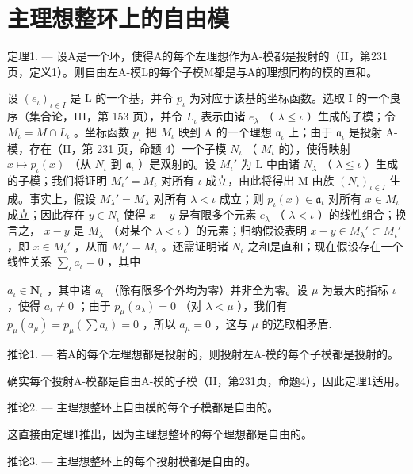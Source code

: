 \section{主理想整环上的自由模}

定理1. --- 设A是一个环，使得A的每个左理想作为A-模都是投射的（II，第231页，定义1）。则自由左A-模L的每个子模M都是与A的理想同构的模的直和。

设 \((e_{\iota})_{\iota \in I}\) 是 L 的一个基，并令 \(p_{\iota}\) 为对应于该基的坐标函数。选取 I 的一个良序（集合论，III，第 153 页），并令 \(L_{\iota}\) 表示由诸 \(e_{\lambda}\) （ \(\lambda \leqslant \iota\) ）生成的子模；令 \(M_{\iota} = M \cap L_{\iota}\) 。坐标函数 \(p_{\iota}\) 把 \(M_{\iota}\) 映到 A 的一个理想 \(\mathfrak{a}_{\iota}\) 上；由于 \(\mathfrak{a}_{\iota}\) 是投射 A-模，存在（II，第 231 页，命题 4）一个子模 \(N_{\iota}\) （ \(M_{\iota}\) 的），使得映射 \(x \mapsto p_{\iota}(x)\) （从 \(N_{\iota}\) 到 \(\mathfrak{a}_{\iota}\) ）是双射的。设 \(M_{\iota}'\) 为 L 中由诸 \(N_{\lambda}\) （ \(\lambda \leqslant \iota\) ）生成的子模；我们将证明 \(M_{\iota}' = M_{\iota}\) 对所有 \(\iota\) 成立，由此将得出 M 由族 \((N_{\iota})_{\iota \in I}\) 生成。事实上，假设 \(M_{\lambda}' = M_{\lambda}\) 对所有 \(\lambda < \iota\) 成立；则 \(p_{\iota}(x) \in \mathfrak{a}_{\iota}\) 对所有 \(x \in M_{\iota}\) 成立；因此存在 \(y \in N_{\iota}\) 使得 \(x - y\) 是有限多个元素 \(e_{\lambda}\) （ \(\lambda < \iota\) ）的线性组合；换言之， \(x - y\) 是 \(M_{\lambda}\) （对某个 \(\lambda < \iota\) ）的元素；归纳假设表明 \(x - y \in M_{\lambda}' \subset M_{\iota}'\) ，即 \(x \in M_{\iota}'\) ，从而 \(M_{\iota}' = M_{\iota}\) 。还需证明诸 \(N_{\iota}\) 之和是直和；现在假设存在一个线性关系 \(\sum_{\iota} a_{\iota} = 0\) ，其中

\(a_{\iota} \in \mathbf{N}_{\iota}\) ，其中诸 \(a_{\iota}\) （除有限多个外均为零）并非全为零。设 \(\mu\) 为最大的指标 \(\iota\) ，使得 \(a_{\iota} \neq 0\) ；由于 \(p_{\mu}(a_{\lambda}) = 0\) （对 \(\lambda < \mu\) ），我们有 \(p_{\mu}(a_{\mu}) = p_{\mu}\left(\sum a_{\iota}\right) = 0\) ，所以 \(a_{\mu} = 0\) ，这与 \(\mu\) 的选取相矛盾.

推论1. --- 若A的每个左理想都是投射的，则投射左A-模的每个子模都是投射的。

确实每个投射A-模都是自由A-模的子模（II，第231页，命题4），因此定理1适用。

推论2. --- 主理想整环上自由模的每个子模都是自由的。

这直接由定理1推出，因为主理想整环的每个理想都是自由的。

推论3. --- 主理想整环上的每个投射模都是自由的。

